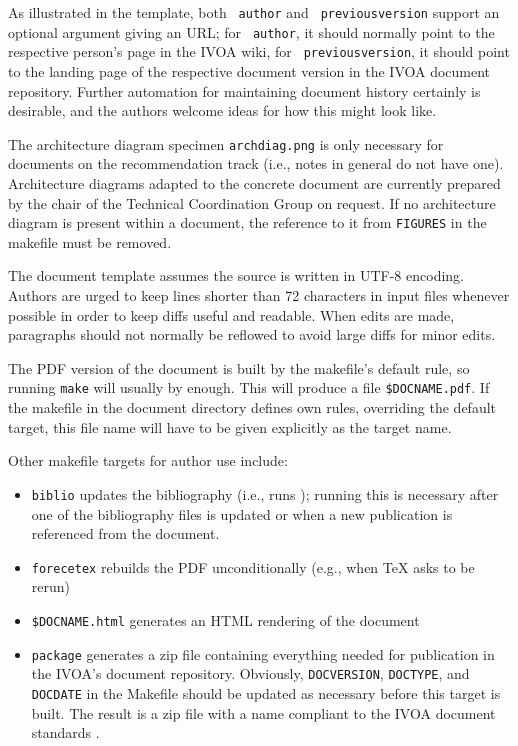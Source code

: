 \documentclass[11pt,a4paper]{ivoa}
\newcommand{\texword}[1]{\texttt{\color{texcolor} #1}}
\begin{document}
As illustrated in the template, both \texword{author} and
\texword{previousversion} support an optional argument giving an URL; for
\texword{author}, it should normally point to the respective person's
page in the IVOA wiki, for \texword{previousversion}, it should point to
the landing page of the respective document version in the IVOA document
repository.  Further automation for maintaining document history
certainly is desirable, and the authors welcome ideas for how this might
look like.

The architecture diagram specimen \texttt{archdiag.png} is only
necessary for documents on the recommendation track (i.e., notes in
general do not have one).  Architecture diagrams adapted to the concrete
document are currently prepared by the chair of the Technical
Coordination Group on request.  If no architecture diagram is present
within a document, the reference to it from \texttt{FIGURES} in the
makefile must be removed.

The document template assumes the source is written in UTF-8 encoding.
Authors are urged to keep lines shorter than 72 characters in input
files whenever possible in order to keep diffs useful and readable.
When edits are made, paragraphs should not normally be reflowed to avoid
large diffs for minor edits.

The PDF version of the document is built by the makefile's default rule,
so running \texttt{make} will usually by enough.  This will produce a
file \texttt{\$DOCNAME.pdf}.  If the makefile in the document directory
defines own rules, overriding the default target, this file name will
have to be given explicitly as the target name.

Other makefile targets for author use include:

\begin{itemize}
\item \texttt{biblio} updates the bibliography (i.e., runs \BibTeX);
running this is necessary after one of the bibliography files is updated
or when a new publication is referenced from the document.
\item \texttt{forecetex} rebuilds the PDF unconditionally (e.g., when TeX
asks to be rerun)
\item \texttt{\$DOCNAME.html} generates an HTML rendering of the document
\item \texttt{package} generates a zip file containing everything needed
for publication in the IVOA's document repository.   Obviously, 
\texttt{DOCVERSION}, \texttt{DOCTYPE}, and \texttt{DOCDATE} in the
Makefile should be updated as necessary before this target is built.
The result is a zip file with a name compliant to the IVOA document
standards \citep{std:docSTD}.
\end{itemize}
\end{document}
